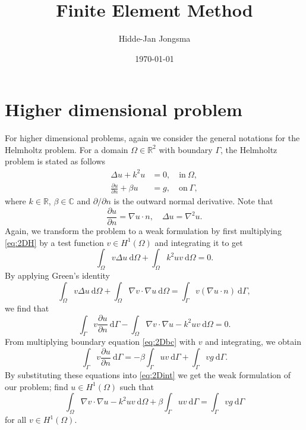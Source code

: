 \documentclass[a4paper]{article}
\author{Hidde-Jan Jongsma}
\title{Finite Element Method}
\date{\today}
\newcommand{\Reals}{\mathbb{R}}
\newcommand{\dd}{\mathrm{d}}
\newcommand{\dun}{\frac{\partial u}{\partial n}}
\newcommand{\lapu}{\nabla^2 u}
\newcommand{\HO}{\ensuremath{H^1(\Omega)}}
\begin{document}
\section{Higher dimensional problem}

For higher dimensional problems, again we consider the general
notations for the Helmholtz problem. For a domain $\Omega \in
\Reals^2$ with boundary $\Gamma$, the Helmholtz problem is stated as
follows
\begin{align}
  \Delta u + k^2 u & = 0, \quad \text{in}\ \Omega, \label{eq:Duku} \\
  \frac{\partial u}{\partial n} + \beta u & = g, \quad \text{on}\ \Gamma, \label{eq:2Dbc}
\end{align}
where $k \in \Reals$, $\beta \in \mathbb{C}$ and
${\partial}/{\partial n}$ is the outward normal derivative. Note
that
\begin{equation*}
  \frac{\partial u}{\partial n} = \nabla u \cdot n, \quad \label{eq:2DH}
  \Delta u = \lapu.
\end{equation*}
Again, we transform the problem to a weak formulation by first
multiplying \eqref{eq:2DH} by a test function $v \in \HO$ and
integrating it to get
\begin{equation} \label{eq:2Dint}
  \int_\Omega v \Delta u \ \dd\Omega + \int_\Omega k^2 u v \ \dd\Omega = 0.
\end{equation}
By applying Green's identity
\begin{equation*}
  \int_\Omega v \Delta u \ \dd \Omega
  + \int_\Omega \nabla v \cdot \nabla u \ \dd\Omega
  =
  \int_\Gamma v(\nabla u \cdot n) \ \dd\Gamma,
\end{equation*}
we find that
\begin{equation*}
  \int_\Gamma v \dun \ \dd\Gamma
  - \int_\Omega \nabla v \cdot \nabla u - k^2 u v \ \dd\Omega
  = 0.
\end{equation*}
From multiplying boundary equation \eqref{eq:2Dbc} with $v$ and
integrating, we obtain
\begin{equation*}
  \int_\Gamma v \dun \ \dd\Gamma
  =
  - \beta \int_\Gamma u v \ \dd\Gamma
  + \int_\Gamma v g \ \dd\Gamma.
\end{equation*}
By substituting these equations into \eqref{eq:2Dint} we get the weak
formulation of our problem; find $u \in \HO$ such that
\begin{equation} \label{eq:2Dweak}
  \int_\Omega \nabla v \cdot \nabla u - k^2 u v \ \dd\Omega
  + \beta \int_\Gamma uv \ \dd\Gamma
  = \int_\Gamma v g \ \dd\Gamma
\end{equation}
for all $v \in \HO$.
\end{document}
